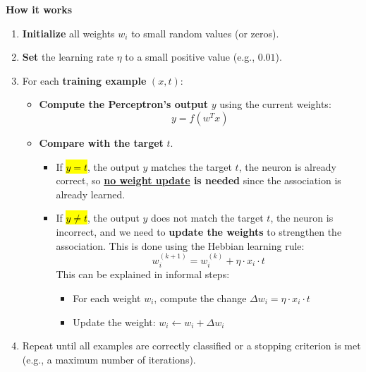 \highspace
\begin{flushleft}
    \textcolor{Green3}{ \textbf{How it works}}
\end{flushleft}
\begin{enumerate}
    \item \textbf{Initialize} all weights $w_i$ to small random values (or zeros).
    \item \textbf{Set} the learning rate $\eta$ to a small positive value (e.g., $0.01$).
    \item For each \textbf{training example} $\left(x, t\right)$:
    \begin{itemize}
        \item \textbf{Compute the Perceptron's output} $y$ using the current weights:
        \begin{equation*}
            y = f\left(w^{T} x\right)
        \end{equation*}
        \item \textbf{Compare with the target} $t$.
        \begin{itemize}
            \item[\textcolor{Green3}{\faIcon{check-circle}}] If \hl{$y = t$}, the output $y$ matches the target $t$, the neuron is already correct, so \textbf{\underline{no weight update} is needed} since the association is already learned.
            \item[\textcolor{Red2}{\faIcon{times-circle}}] If \hl{$y \neq t$}, the output $y$ does not match the target $t$, the neuron is incorrect, and we need to \textbf{update the weights} to strengthen the association. This is done using the Hebbian learning rule:
            \begin{equation*}
                w_{i}^{(k+1)} = w_{i}^{(k)} + \eta \cdot x_{i} \cdot t
            \end{equation*}
            This can be explained in informal steps:
            \begin{itemize}
                \item For each weight $w_i$, compute the change $\Delta w_i = \eta \cdot x_i \cdot t$
                \item Update the weight: $w_i \leftarrow w_i + \Delta w_i$
            \end{itemize}
        \end{itemize}
    \end{itemize}
    \item Repeat until all examples are correctly classified or a stopping criterion is met (e.g., a maximum number of iterations).
\end{enumerate}

